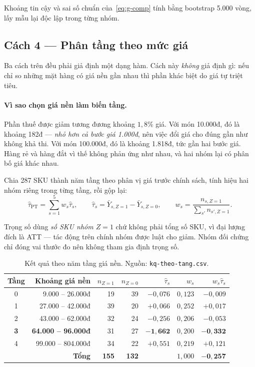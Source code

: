 \documentclass[11pt]{article}
\begin{document}
Khoảng tin cậy và sai số chuẩn của~\eqref{eq:g-comp} tính bằng bootstrap 5.000 vòng, lấy mẫu lại
độc lập trong từng nhóm.

\subsection{Cách 4 --- Phân tầng theo mức giá}
\label{sec:cach-4}

Ba cách trên đều phải giả định một dạng hàm. Cách này \emph{không} giả định gì: nếu chỉ so những
mặt hàng có giá nền gần nhau thì phần khác biệt do giá tự triệt tiêu.

\paragraph{Vì sao chọn giá nền làm biến tầng.} Phần thuế được giảm tương đương khoảng $1{,}8\%$
giá. Với món 10.000đ, đó là khoảng 182đ --- \emph{nhỏ hơn cả bước giá 1.000đ}, nên việc đổi giá cho
đúng gần như không khả thi. Với món 100.000đ, đó là khoảng 1.818đ, tức gần hai bước giá. Hàng rẻ và
hàng đắt vì thế không phản ứng như nhau, và hai nhóm lại có phân bố giá khác nhau.

Chia 287 SKU thành năm tầng theo phân vị giá trước chính sách, tính hiệu hai nhóm riêng trong từng
tầng, rồi gộp lại:
\begin{equation}
  \hat\tau_{\text{PT}} = \sum_{s=1}^{5} w_s \hat\tau_s,
  \qquad
  \hat\tau_s = \bar Y_{s,Z=1} - \bar Y_{s,Z=0},
  \qquad
  w_s = \frac{n_{s,Z=1}}{\sum_{s'} n_{s',Z=1}}.
  \label{eq:pp2}
\end{equation}

Trọng số dùng \emph{số SKU nhóm $Z=1$} chứ không phải tổng số SKU, vì đại lượng đích là ATT --- tác
động trên chính nhóm được luật cho giảm. Nhóm đối chứng chỉ đóng vai thước đo nên không tham gia
định trọng số.

\begin{table}[htbp]
  \centering
  \caption{Kết quả theo năm tầng giá nền. Nguồn: \texttt{kq-theo-tang.csv}.}
  \label{tab:theo-tang}
  \begin{tabular}{crrrrrr}
    \toprule
    Tầng & Khoảng giá nền & $n_{Z=1}$ & $n_{Z=0}$ & $\hat\tau_s$ & $w_s$ & $w_s\hat\tau_s$ \\
    \midrule
    0 & 9.000 -- 26.000đ    & 19 & 39 & $-0{,}076$ & $0{,}123$ & $-0{,}009$ \\
    1 & 27.000 -- 42.000đ   & 39 & 20 & $+0{,}066$ & $0{,}252$ & $+0{,}017$ \\
    2 & 43.000 -- 62.000đ   & 32 & 24 & $-0{,}256$ & $0{,}206$ & $-0{,}053$ \\
    \textbf{3} & \textbf{64.000 -- 96.000đ} & 31 & 27 & $\mathbf{-1{,}662}$ & $0{,}200$
    & $\mathbf{-0{,}332}$ \\
    4 & 99.000 -- 804.000đ  & 34 & 22 & $+0{,}551$ & $0{,}219$ & $+0{,}121$ \\
    \midrule
    & \textbf{Tổng} & \textbf{155} & \textbf{132} & & $1{,}000$ & $\mathbf{-0{,}257}$ \\
    \bottomrule
  \end{tabular}
\end{table}
\end{document}
